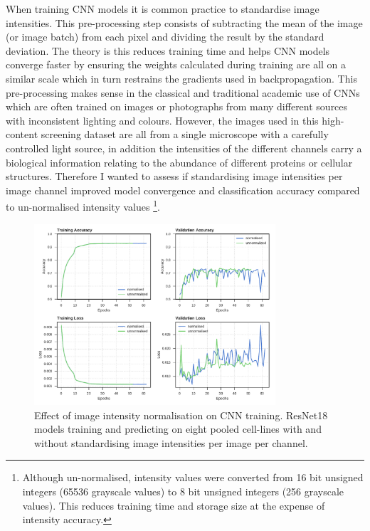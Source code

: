 \documentclass[a4paper,11pt,twoside,openright]{scrbook}
\begin{document}
When training CNN models it is common practice to standardise image intensities.
This pre-processing step consists of subtracting the mean of the image (or image batch) from each pixel and dividing the result by the standard deviation.
The theory is this reduces training time and helps CNN models converge faster by ensuring the weights calculated during training are all on a similar scale which in turn restrains the gradients used in backpropagation.
This pre-processing makes sense in the classical and traditional academic use of CNNs which are often trained on images or photographs from many different sources with inconsistent lighting and colours.
However, the images used in this high-content screening dataset are all from a single microscope with a carefully controlled light source, in addition the intensities of the different channels carry a biological information relating to the abundance of different proteins or cellular structures.
Therefore I wanted to assess if standardising image intensities per image channel improved model convergence and classification accuracy compared to un-normalised intensity values
\footnote{Although un-normalised, intensity values were converted from 16 bit unsigned integers (65536 grayscale values) to 8 bit unsigned integers (256 grayscale values).
This reduces training time and storage size at the expense of intensity accuracy.}.


\begin{figure}
    \includegraphics[width=0.8\textwidth]{ch2imgNorm}
    \captionsetup{width=0.8\textwidth}
    \caption[Effect of image intensity normalisation on CNN training]{Effect of image intensity normalisation on CNN training. ResNet18 models training and predicting on eight pooled cell-lines with and without standardising image intensities per image per channel.}
    \label{figure:img_norm}
\end{figure}
\end{document}
